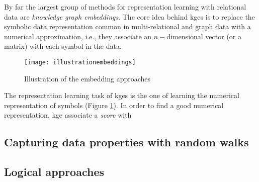 
By far the largest group of methods for representation learning with relational data are \textit{knowledge graph embeddings}.
The core idea behind \gls{kge}s is to replace the symbolic data representation common in multi-relational and graph data with a numerical approximation, i.e., they associate an $n-$dimensional vector (or a matrix) with each symbol in the data.


 \begin{figure}
	\centering
	\texttt{[image: illustrationembeddings]}
	\caption{Illustration of the embedding approaches}
	\label{fig:emb}
\end{figure}


The representation learning task of \gls{kge}s is the one of learning the numerical representation of symbols (Figure \ref{fig:emb}).
In order to find a good numerical representation, \gls{kge} associate a \textit{score} with 
 
 





\subsection{Capturing data properties with random walks}



\subsection{Logical approaches}



\cleardoublepage

